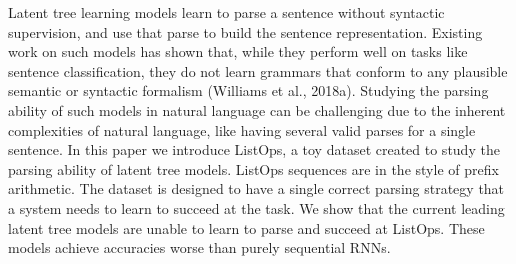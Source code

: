 Latent tree learning models learn to parse a sentence without syntactic supervision, and use that parse to build the sentence representation. Existing work on such models has shown that, while they perform well on tasks like sentence classification, they do not learn grammars that conform to any plausible semantic or syntactic formalism (Williams et al., 2018a). Studying the parsing ability of such models in natural language can be challenging due to the inherent complexities of natural language, like having several valid parses for a single sentence. In this paper we introduce ListOps, a toy dataset created to study the parsing ability of latent tree models. ListOps sequences are in the style of prefix arithmetic. The dataset is designed to have a single correct parsing strategy that a system needs to learn to succeed at the task. We show that the current leading latent tree models are unable to learn to parse and succeed at ListOps. These models achieve accuracies worse than purely sequential RNNs.
